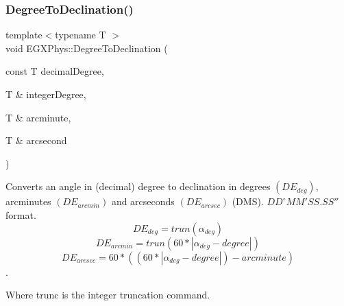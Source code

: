 \subsubsection{\texorpdfstring{Degree\+To\+Declination()}{DegreeToDeclination()}}
{\footnotesize\ttfamily template$<$typename T $>$ \\
void E\+G\+X\+Phys\+::\+Degree\+To\+Declination (\begin{DoxyParamCaption}\item[{const T}]{decimal\+Degree,  }\item[{T \&}]{integer\+Degree,  }\item[{T \&}]{arcminute,  }\item[{T \&}]{arcsecond }\end{DoxyParamCaption})}



Converts an angle in (decimal) degree to declination in degrees $(DE_{deg})$, arcminutes $(DE_{arcmin})$ and arcseconds $(DE_{arcsec})$ (D\+MS). ${DD}^{\circ}{MM}'{SS.SS}''$ format. \[DE_{deg}=trun(\alpha_{deg})\] \[DE_{arcmin}=trun(60 * |\alpha_{deg} - degree|)\] \[DE_{arcsec}=60 * ((60 * |\alpha_{deg} - degree|)-arcminute)\]. 

Where trunc is the integer truncation command.

